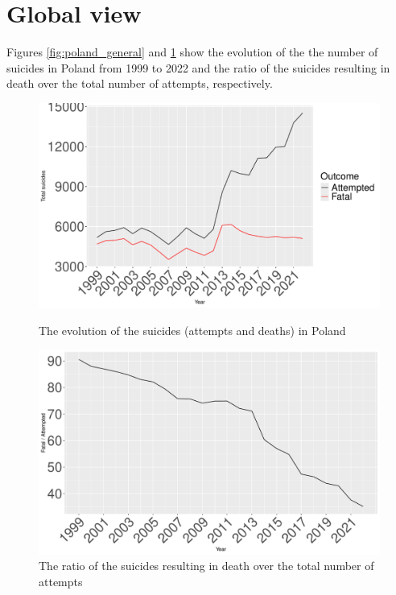 \documentclass{article}
\begin{document}
\section{Global view}
Figures \ref{fig:poland_general} and \ref{fig:poland_foa} show the evolution of the the 
number of suicides in Poland from 1999 to 2022 and the ratio of the suicides resulting
in death over the total number of attempts, respectively.
\begin{figure}[H]
	\centering
	\begin{minipage}{0.55\textwidth}
		\includegraphics[width=\textwidth]{imgs/poland_general.pdf}
		\caption{The evolution of the suicides (attempts and deaths) in Poland}
		\label{fig:poland_general}
	\end{minipage}
	\hfill
	\begin{minipage}{0.55\textwidth}
		\includegraphics[width=\textwidth]{imgs/poland_foa.pdf}
		\caption{The ratio of the suicides resulting in death over the total number of attempts}
		\label{fig:poland_foa}
	\end{minipage}
\end{figure}
\end{document}
